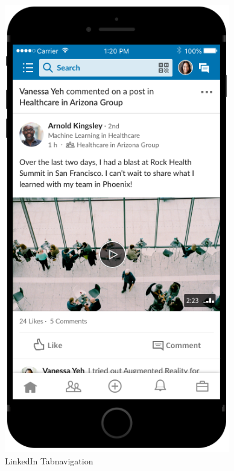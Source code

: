 \begin{figure}[H]
\begin{minipage}[b]{0.4\textwidth}
  \end{minipage}
  \hfill
  \begin{minipage}[b]{0.4\textwidth}
    \includegraphics[width=\textwidth]{images/linkedin.PNG}
    \caption{LinkedIn Tabnavigation}
    \label{fig:linkedin}
  \end{minipage}
\end{figure}


